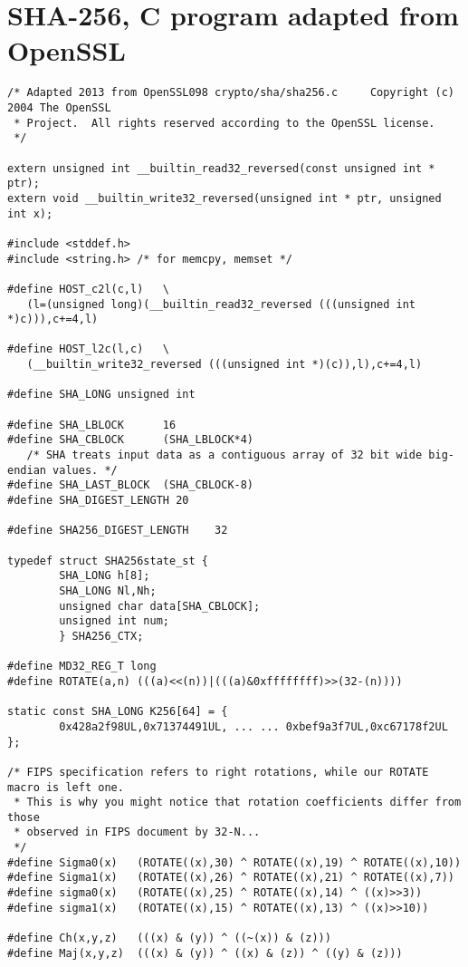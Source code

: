 \documentclass[prodmode,acmtoplas]{acmsmall}
\begin{document}
\section{SHA-256, C program adapted from OpenSSL}
{\small \begin{verbatim}
/* Adapted 2013 from OpenSSL098 crypto/sha/sha256.c     Copyright (c) 2004 The OpenSSL 
 * Project.  All rights reserved according to the OpenSSL license.
 */

extern unsigned int __builtin_read32_reversed(const unsigned int * ptr);
extern void __builtin_write32_reversed(unsigned int * ptr, unsigned int x);

#include <stddef.h>
#include <string.h> /* for memcpy, memset */

#define HOST_c2l(c,l)   \
   (l=(unsigned long)(__builtin_read32_reversed (((unsigned int *)c))),c+=4,l)

#define HOST_l2c(l,c)   \
   (__builtin_write32_reversed (((unsigned int *)(c)),l),c+=4,l)

#define SHA_LONG unsigned int

#define SHA_LBLOCK      16
#define SHA_CBLOCK      (SHA_LBLOCK*4)  
   /* SHA treats input data as a contiguous array of 32 bit wide big-endian values. */
#define SHA_LAST_BLOCK  (SHA_CBLOCK-8)
#define SHA_DIGEST_LENGTH 20

#define SHA256_DIGEST_LENGTH    32

typedef struct SHA256state_st {
        SHA_LONG h[8];
        SHA_LONG Nl,Nh;
        unsigned char data[SHA_CBLOCK];
        unsigned int num;
        } SHA256_CTX;

#define MD32_REG_T long
#define ROTATE(a,n) (((a)<<(n))|(((a)&0xffffffff)>>(32-(n))))

static const SHA_LONG K256[64] = {
        0x428a2f98UL,0x71374491UL, ... ... 0xbef9a3f7UL,0xc67178f2UL };

/* FIPS specification refers to right rotations, while our ROTATE macro is left one. 
 * This is why you might notice that rotation coefficients differ from those 
 * observed in FIPS document by 32-N...
 */
#define Sigma0(x)   (ROTATE((x),30) ^ ROTATE((x),19) ^ ROTATE((x),10))
#define Sigma1(x)   (ROTATE((x),26) ^ ROTATE((x),21) ^ ROTATE((x),7))
#define sigma0(x)   (ROTATE((x),25) ^ ROTATE((x),14) ^ ((x)>>3))
#define sigma1(x)   (ROTATE((x),15) ^ ROTATE((x),13) ^ ((x)>>10))

#define Ch(x,y,z)   (((x) & (y)) ^ ((~(x)) & (z)))
#define Maj(x,y,z)  (((x) & (y)) ^ ((x) & (z)) ^ ((y) & (z)))


\end{verbatim}}
\end{document}
